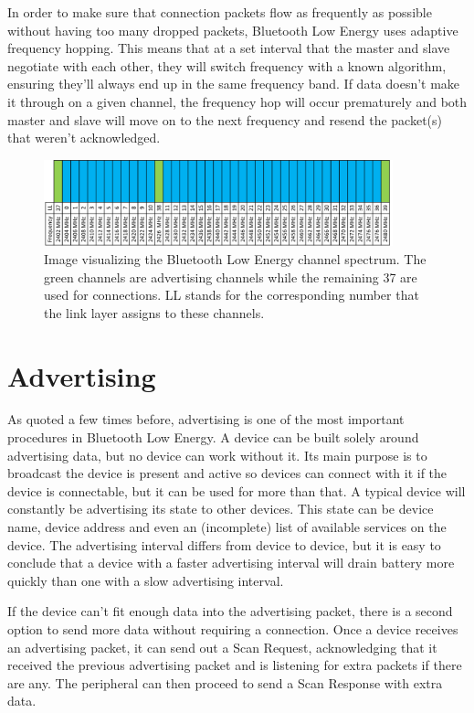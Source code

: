 \documentclass[pdftex,a4paper,12pt,twoside]{report}
\begin{document}
In order to make sure that connection packets flow as frequently as possible without having too many dropped packets, Bluetooth Low Energy uses adaptive frequency hopping. This means that at a set interval that the master and slave negotiate with each other, they will switch frequency with a known algorithm, ensuring they'll always end up in the same frequency band. If data doesn't make it through on a given channel, the frequency hop will occur prematurely and both master and slave will move on to the next frequency and resend the packet(s) that weren't acknowledged.

\begin{figure}[h]
    \centering
    \includegraphics[width=0.9\textwidth]{img/channelmap.png}
    \caption[Image visualizing the Bluetooth Low Energy channel spectrum]{Image visualizing the Bluetooth Low Energy channel spectrum. The green channels are advertising channels while the remaining 37 are used for connections. LL stands for the corresponding number that the link layer assigns to these channels.}
    \label{fig:channelmap}
\end{figure}

\section{Advertising}
\label{sec:advertising}
As quoted a few times before, advertising is one of the most important procedures in Bluetooth Low Energy. A device can be built solely around advertising data, but no device can work without it. Its main purpose is to broadcast the device is present and active so devices can connect with it if the device is connectable, but it can be used for more than that. A typical device will constantly be advertising its state to other devices. This state can be device name, device address and even an (incomplete) list of available services on the device. The advertising interval differs from device to device, but it is easy to conclude that a device with a faster advertising interval will drain battery more quickly than one with a slow advertising interval.

If the device can't fit enough data into the advertising packet, there is a second option to send more data without requiring a connection. Once a device receives an advertising packet, it can send out a Scan Request, acknowledging that it received the previous advertising packet and is listening for extra packets if there are any. The peripheral can then proceed to send a Scan Response with extra data.
\end{document}
